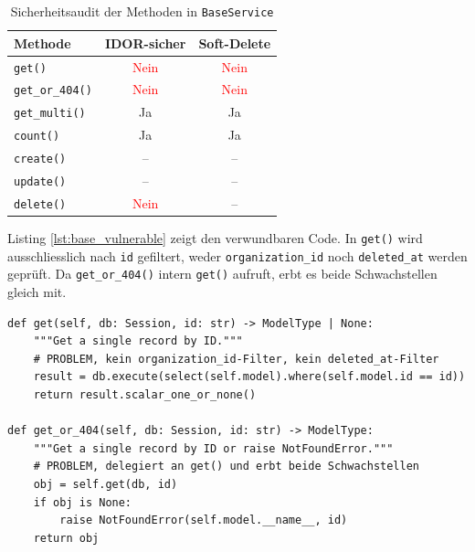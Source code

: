 \begin{table}[H]
    \begin{center}
        \renewcommand{\arraystretch}{1.4}
        \begin{tabular}{|l|c|c|}
            \hline
            \textbf{Methode}        & \textbf{IDOR-sicher}           & \textbf{Soft-Delete}           \\
            \hline
            \texttt{get()}          & \textcolor{red}{Nein}          & \textcolor{red}{Nein}          \\
            \texttt{get\_or\_404()} & \textcolor{red}{Nein}          & \textcolor{red}{Nein}          \\
            \texttt{get\_multi()}   & \textcolor{green!60!black}{Ja} & \textcolor{green!60!black}{Ja} \\
            \texttt{count()}        & \textcolor{green!60!black}{Ja} & \textcolor{green!60!black}{Ja} \\
            \texttt{create()}       &  --                            & --                             \\
            \texttt{update()}       &  --                            & --                             \\
            \texttt{delete()}       & \textcolor{red}{Nein}          & --                             \\
            \hline
        \end{tabular}
    \end{center}
    \caption{Sicherheitsaudit der Methoden in \texttt{BaseService}}
    \label{tab:baseservice_audit}
\end{table}

Listing \ref{lst:base_vulnerable} zeigt den verwundbaren Code. In \texttt{get()} wird
ausschliesslich nach \texttt{id} gefiltert, weder \texttt{organization\_id} noch
\texttt{deleted\_at} werden geprüft. Da \texttt{get\_or\_404()} intern \texttt{get()}
aufruft, erbt es beide Schwachstellen gleich mit.

\begin{lstlisting}[style=custompython,
  caption={Verwundbare Methoden in \texttt{base.py}},
  label={lst:base_vulnerable}]
def get(self, db: Session, id: str) -> ModelType | None:
    """Get a single record by ID."""
    # PROBLEM, kein organization_id-Filter, kein deleted_at-Filter
    result = db.execute(select(self.model).where(self.model.id == id))
    return result.scalar_one_or_none()

def get_or_404(self, db: Session, id: str) -> ModelType:
    """Get a single record by ID or raise NotFoundError."""
    # PROBLEM, delegiert an get() und erbt beide Schwachstellen
    obj = self.get(db, id)
    if obj is None:
        raise NotFoundError(self.model.__name__, id)
    return obj
\end{lstlisting}

